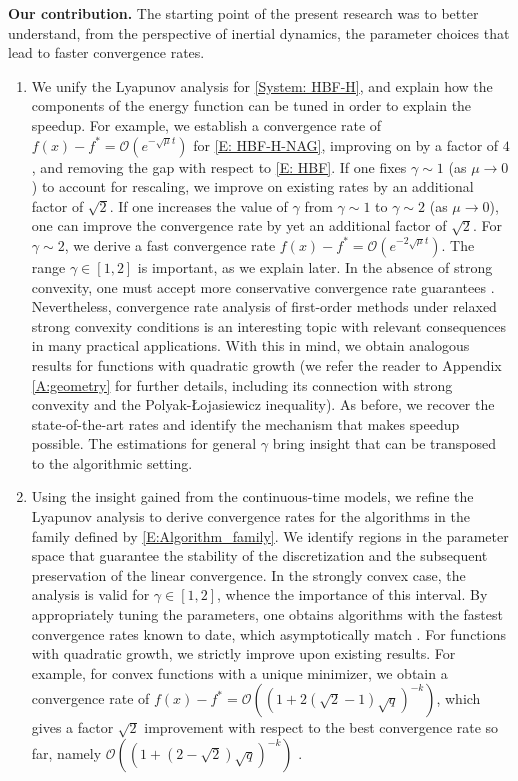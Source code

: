 \documentclass[pdflatex,sn-mathphys-num]{sn-jnl}
\theoremstyle{thmstyleone}
\theoremstyle{thmstyletwo}
\theoremstyle{thmstylethree}
\begin{document}
{\bf Our contribution.} The starting point of the present research was to better understand, from the perspective of inertial dynamics, the parameter choices that lead to faster convergence rates. 
\begin{enumerate}
    \item We unify the Lyapunov analysis for \eqref{System: HBF-H}, and explain how the components of the energy function can be tuned in order to explain the speedup. For example, we establish a convergence rate of $f(x)-f^*=\mathcal O\left(e^{-\sqrt{\mu}t}\right)$ for \eqref{E: HBF-H-NAG}, improving on \cite{Shi_2022} by a factor of $4$, and removing the gap with respect to \eqref{E: HBF}. If one fixes $\gamma\sim 1$ (as $\mu\to 0$) to account for rescaling, we improve on existing rates by an additional factor of $\sqrt{2}$. If one increases the value of $\gamma$ from $\gamma\sim 1$ to $\gamma\sim 2$ (as $\mu\to 0$), one can improve the convergence rate by yet an additional factor of $\sqrt{2}$. For $\gamma\sim 2$, we derive a fast convergence rate $f(x)-f^*=\mathcal O\left(e^{-2\sqrt{\mu}t}\right)$. The range $\gamma\in[1,2]$ is important, as we explain later. In the absence of strong convexity, one must accept more conservative convergence rate guarantees \cite{Lin_2023}. Nevertheless, convergence rate analysis of first-order methods under relaxed strong convexity conditions \cite{Aujol_2022,Aujol_2023,Bolte_2017,Zhang_2017,Karimi_2016,Lewis_2018,Necoara_2019} is an interesting topic with relevant consequences in many practical applications. With this in mind, we obtain analogous results for functions with quadratic growth (we refer the reader to Appendix \ref{A:geometry} for further details, including its connection with strong convexity and the Polyak-{\L}ojasiewicz inequality). As before, we recover the state-of-the-art rates and identify the mechanism that makes speedup possible. The estimations for general $\gamma$ bring insight that can be transposed to the algorithmic setting. 


    \item Using the insight gained from the continuous-time models, we refine the Lyapunov analysis to derive convergence rates for the algorithms in the family defined by \eqref{E:Algorithm_family}. We identify regions in the parameter space that guarantee the stability of the discretization and the subsequent preservation of the linear convergence. In the strongly convex case, the analysis is valid for $\gamma\in[1,2]$, whence the importance of this interval. By appropriately tuning the parameters, one obtains algorithms with the fastest convergence rates known to date, which asymptotically match \cite{Scoy_2018,Taylor_2023_optimal}. For functions with quadratic growth, we strictly improve upon existing results. For example, for convex functions with a unique minimizer, we obtain a convergence rate of $f(x)-f^*=\mathcal O\left( (1+2(\sqrt{2}-1)\sqrt{q})^{-k} \right)$, which gives a factor $\sqrt{2}$ improvement with respect to the best convergence rate so far, namely $\mathcal{O}\left( (1+(2-\sqrt{2})\sqrt{q})^{-k} \right)$ \cite{Aujol_2023}.
    
\end{enumerate}
\end{document}
